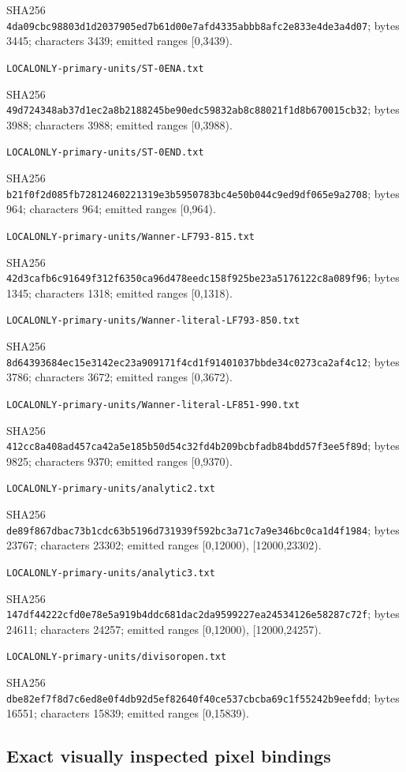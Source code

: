 \documentclass[11pt]{article}
\begin{document}
SHA256 \texttt{4da09cbc98803d1d2037905ed7b61d00e7afd4335abbb8afc2e833e4de3a4d07}; bytes 3445; characters 3439; emitted ranges [0,3439).

\texttt{LOCALONLY-primary-units/\allowbreak ST-0ENA.txt}

SHA256 \texttt{49d724348ab37d1ec2a8b2188245be90edc59832ab8c88021f1d8b670015cb32}; bytes 3988; characters 3988; emitted ranges [0,3988).

\texttt{LOCALONLY-primary-units/\allowbreak ST-0END.txt}

SHA256 \texttt{b21f0f2d085fb72812460221319e3b5950783bc4e50b044c9ed9df065e9a2708}; bytes 964; characters 964; emitted ranges [0,964).

\texttt{LOCALONLY-primary-units/\allowbreak Wanner-LF793-815.txt}

SHA256 \texttt{42d3cafb6c91649f312f6350ca96d478eedc158f925be23a5176122c8a089f96}; bytes 1345; characters 1318; emitted ranges [0,1318).

\texttt{LOCALONLY-primary-units/\allowbreak Wanner-literal-LF793-850.txt}

SHA256 \texttt{8d64393684ec15e3142ec23a909171f4cd1f91401037bbde34c0273ca2af4c12}; bytes 3786; characters 3672; emitted ranges [0,3672).

\texttt{LOCALONLY-primary-units/\allowbreak Wanner-literal-LF851-990.txt}

SHA256 \texttt{412cc8a408ad457ca42a5e185b50d54c32fd4b209bcbfadb84bdd57f3ee5f89d}; bytes 9825; characters 9370; emitted ranges [0,9370).

\texttt{LOCALONLY-primary-units/\allowbreak analytic2.txt}

SHA256 \texttt{de89f867dbac73b1cdc63b5196d731939f592bc3a71c7a9e346bc0ca1d4f1984}; bytes 23767; characters 23302; emitted ranges [0,12000), [12000,23302).

\texttt{LOCALONLY-primary-units/\allowbreak analytic3.txt}

SHA256 \texttt{147df44222cfd0e78e5a919b4ddc681dac2da9599227ea24534126e58287c72f}; bytes 24611; characters 24257; emitted ranges [0,12000), [12000,24257).

\texttt{LOCALONLY-primary-units/\allowbreak divisoropen.txt}

SHA256 \texttt{dbe82ef7f8d7c6ed8e0f4db92d5ef82640f40ce537cbcba69c1f55242b9eefdd}; bytes 16551; characters 15839; emitted ranges [0,15839).

\subsection*{Exact visually inspected pixel bindings}
\end{document}
